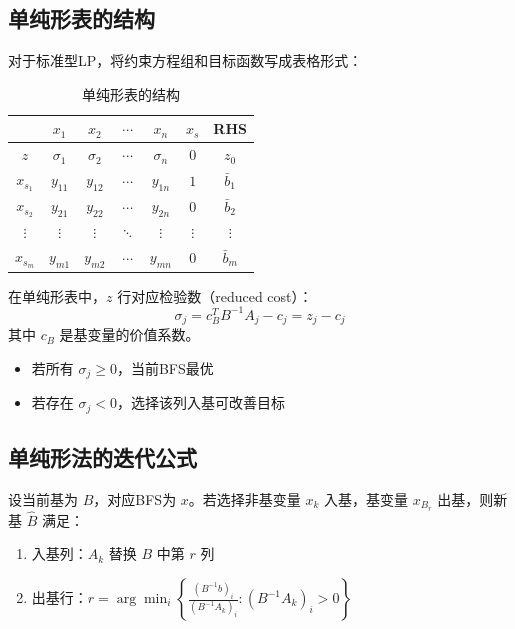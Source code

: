 \subsection{单纯形表的结构}

对于标准型LP，将约束方程组和目标函数写成表格形式：

\begin{table}[H]
\centering
\caption{单纯形表的结构}
\begin{tabular}{@{}c|ccccc|c@{}}
\toprule
& $x_1$ & $x_2$ & $\cdots$ & $x_n$ & $x_{s}$ & RHS \\
\midrule
$z$ & $\sigma_1$ & $\sigma_2$ & $\cdots$ & $\sigma_n$ & $0$ & $z_0$ \\
\midrule
$x_{s_1}$ & $y_{11}$ & $y_{12}$ & $\cdots$ & $y_{1n}$ & $1$ & $\bar{b}_1$ \\
$x_{s_2}$ & $y_{21}$ & $y_{22}$ & $\cdots$ & $y_{2n}$ & $0$ & $\bar{b}_2$ \\
$\vdots$ & $\vdots$ & $\vdots$ & $\ddots$ & $\vdots$ & $\vdots$ & $\vdots$ \\
$x_{s_m}$ & $y_{m1}$ & $y_{m2}$ & $\cdots$ & $y_{mn}$ & $0$ & $\bar{b}_m$ \\
\bottomrule
\end{tabular}
\end{table}

\begin{notebox}[检验数]
在单纯形表中，$z$ 行对应检验数（reduced cost）：
\[
\sigma_j = c_B^T B^{-1} A_j - c_j = z_j - c_j
\]
其中 $c_B$ 是基变量的价值系数。

\begin{itemize}
    \item 若所有 $\sigma_j \geq 0$，当前BFS最优
    \item 若存在 $\sigma_j < 0$，选择该列入基可改善目标
\end{itemize}
\end{notebox}

\subsection{单纯形法的迭代公式}

\begin{theorem}[基变换]
设当前基为 $B$，对应BFS为 $x$。若选择非基变量 $x_k$ 入基，基变量 $x_{B_r}$ 出基，则新基 $\hat{B}$ 满足：
\begin{enumerate}
    \item 入基列：$A_k$ 替换 $B$ 中第 $r$ 列
    \item 出基行：$r = \arg\min_i \left\{\frac{(B^{-1}b)_i}{(B^{-1}A_k)_i} : (B^{-1}A_k)_i > 0\right\}$
\end{enumerate}
\end{theorem}

